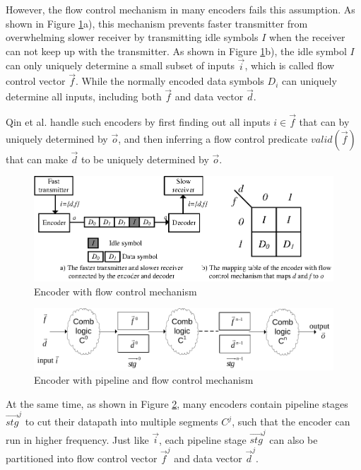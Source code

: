 \documentclass[runningheads,a4paper,orivec]{llncs}
\begin{document}
However,
the flow control mechanism \cite{flowcontrol} in many encoders
fails this assumption.
As shown in Figure \ref{fig_fc}a),
this mechanism prevents faster transmitter from overwhelming slower receiver
by transmitting idle symbols $I$ when the receiver can not keep up with the transmitter.
As shown in Figure \ref{fig_fc}b),
the idle symbol $I$
can only uniquely determine a small subset of inputs $\vec{i}$,
which is called flow control vector $\vec{f}$.
While the normally encoded data symbols $D_i$ can
uniquely determine all inputs, 
including both $\vec{f}$ and data vector $\vec{d}$.

Qin et al. \cite{QinTODAES15} handle such encoders by
first finding out all inputs $i\in\vec{f}$ that can by uniquely determined by $\vec{o}$,
and then inferring a flow control predicate $valid(\vec{f})$ that
can make $\vec{d}$ to be uniquely determined by $\vec{o}$.

\begin{figure}[t]
\centering
\includegraphics[width=\textwidth]{nonuniq}
\caption{Encoder with flow control mechanism}
\label{fig_fc}
\end{figure}

\begin{figure}[b]
\centering
\includegraphics[width=\textwidth]{pipemod1}
\caption{Encoder with pipeline and flow control mechanism}
\label{pipemod}
\end{figure}



At the same time,
as shown in Figure \ref{pipemod},
many encoders contain
pipeline stages $\vec{stg}^j$ to cut their datapath into multiple segments $C^j$,
such that the encoder can run in higher frequency.
Just like $\vec{i}$,
each pipeline stage $\vec{stg}^j$ can also be partitioned into flow control vector $\vec{f}^j$ and data vector $\vec{d}^j$.
\end{document}
